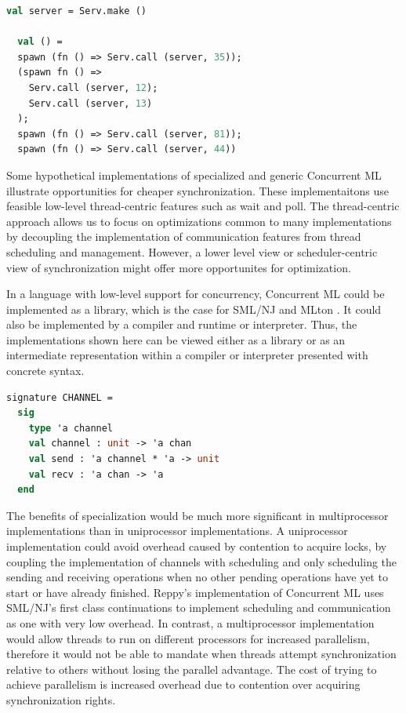 \documentclass[letterpaper, 11pt]{extarticle}
\begin{document}
\begin{lstlisting}[language=ML, mathescape]
  val server = Serv.make ()

  val () =
  spawn (fn () => Serv.call (server, 35));
  (spawn fn () => 
    Serv.call (server, 12); 
    Serv.call (server, 13)
  );
  spawn (fn () => Serv.call (server, 81));
  spawn (fn () => Serv.call (server, 44))
\end{lstlisting}


Some hypothetical implementations of specialized and generic
Concurrent ML illustrate opportunities
for cheaper synchronization. These implementaitons use 
feasible low-level thread-centric features such as wait and poll.  The thread-centric approach
allows us to focus on optimizations common to many implementations by decoupling the
implementation of communication features from thread scheduling and management. However, a
lower level view or scheduler-centric view of synchronization might offer more opportunites
for optimization.

In a language with low-level support for concurrency,
Concurrent ML could be implemented as a library,
which is the case for SML/NJ \cite{smlnj} and MLton \cite{mlton}.
It could also be implemented by a compiler and runtime or interpreter.
Thus, the implementations shown here can be viewed either as a library or as an intermediate
representation within a compiler or interpreter presented with concrete syntax.

\begin{lstlisting}[language=ML, mathescape]
  signature CHANNEL =
  sig
    type 'a channel 
    val channel : unit -> 'a chan
    val send : 'a channel * 'a -> unit
    val recv : 'a chan -> 'a
  end     
\end{lstlisting}

The benefits of specialization would be much more significant in multiprocessor
implementations than in uniprocessor implementations. A uniprocessor
implementation could avoid overhead caused by contention to acquire locks, by coupling the
implementation of channels with scheduling and only scheduling the sending and receiving
operations when no other pending operations have yet to start or have already finished.
Reppy's implementation of
Concurrent ML uses SML/NJ's first class continuations to implement scheduling and communication
as one with very low overhead. In contrast, a multiprocessor
implementation would allow threads to run
on different processors for increased parallelism,
therefore it would not be able to mandate when
threads attempt synchronization relative to others without losing the parallel advantage.
The cost of trying to achieve parallelism
is increased overhead due to contention over acquiring
synchronization rights. 
\end{document}
